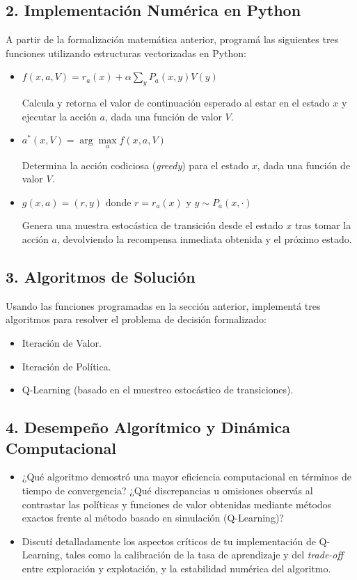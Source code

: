 \documentclass[11pt]{article}
\begin{document}
\subsection*{2. Implementación Numérica en Python}

A partir de la formalización matemática anterior, programá las siguientes tres funciones utilizando estructuras vectorizadas en Python:

\begin{itemize}
    \item $f(x, a, V) = r_a(x) + \alpha \sum_y P_a(x,y) V(y)$ 
    
    Calcula y retorna el valor de continuación esperado al estar en el estado $x$ y ejecutar la acción $a$, dada una función de valor $V$.
    
    \item $a^*(x, V) = \arg\max\limits_a f(x,a,V)$
    
    Determina la acci\'on codiciosa (\textit{greedy}) para el estado $x$, dada una función de valor $V$.
    
    \item $g(x,a) = (r,y)$ \quad donde \quad $r = r_a(x)$ \quad y \quad $y \sim P_a(x, \cdot)$
    
   Genera una muestra estocástica de transición desde el estado $x$ tras tomar la acción $a$, devolviendo la recompensa inmediata obtenida y el pr\'oximo estado.
\end{itemize}

\subsection*{3. Algoritmos de Solución}

Usando las funciones programadas en la sección anterior, implementá tres algoritmos para resolver el problema de decisión formalizado:
\begin{itemize}
    \item Iteración de Valor.
    \item Iteración de Política.
    \item Q-Learning (basado en el muestreo estocástico de transiciones).
\end{itemize}

\subsection*{4. Desempeño Algorítmico y Dinámica Computacional}
\begin{itemize}
\item ¿Qué algoritmo demostró una mayor eficiencia computacional en términos de tiempo de convergencia? ¿Qué discrepancias u omisiones observás al contrastar las políticas y funciones de valor obtenidas mediante métodos exactos frente al método basado en simulaci\'on (Q-Learning)? 

\item Discutí detalladamente los aspectos críticos de tu implementación de Q-Learning, tales como la calibración de la tasa de aprendizaje y del \textit{trade-off} entre exploración y explotación, y la estabilidad numérica del algoritmo.
\end{itemize}
\end{document}
